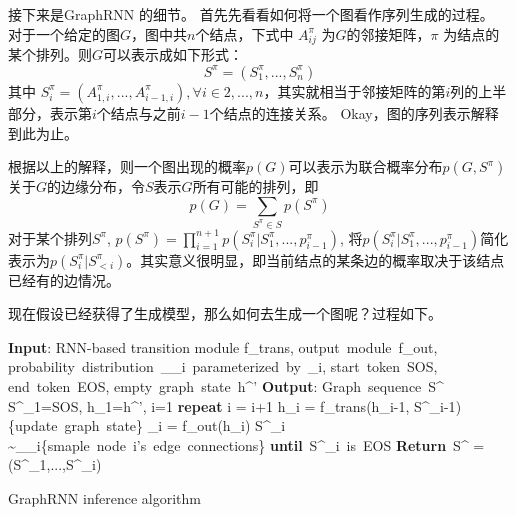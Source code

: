 \par 接下来是GraphRNN 的细节。
首先先看看如何将一个图看作序列生成的过程。
对于一个给定的图$G$，图中共$n$个结点，下式中 $A^{\pi}_{ij}$ 为$G$的邻接矩阵，$\pi$ 为结点的某个排列。则$G$可以表示成如下形式： 
$$
S^\pi = (S^{\pi}_1,...,S^{\pi}_n)
$$
其中 $S^{\pi}_i = (A^{\pi}_{1,i},..., A^{\pi}_{i-1,i}), \forall i \in {2,...,n} $，其实就相当于邻接矩阵的第$i$列的上半部分，表示第$i$个结点与之前$i-1$个结点的连接关系。
Okay，图的序列表示解释到此为止。

\par 根据以上的解释，则一个图出现的概率$p(G)$可以表示为联合概率分布$p(G, S^{\pi})$ 关于$G$的边缘分布，令$S$表示$G$所有可能的排列，即
$$
p(G) = \sum_{S^{\pi} \in S } p(S^{\pi}) 
$$
对于某个排列$S^{\pi}$, $p(S^{\pi}) = \prod_{i=1}^{n+1} p(S^{\pi}_i | S^{\pi}_1,...,p^{\pi}_{i-1})$, 将$p(S^{\pi}_i | S^{\pi}_1,...,p^{\pi}_{i-1})$简化表示为$p(S^{\pi}_i | S^{\pi}_{<i})$。其实意义很明显，即当前结点的某条边的概率取决于该结点已经有的边情况。

\par 现在假设已经获得了生成模型，那么如何去生成一个图呢？过程如下。
\begin{algorithm}[H]
    \begin{algorithmic}[1]
        \textbf{Input}: RNN-based transition module f_{trans}, output\ module\ f_{out}, \newline
        probability\ distribution\ _{\theta_{i}}\ parameterized\ by\ \theta_{i}, start\ token\ SOS, end\ token\  EOS, empty\ graph\ state\ h^{'} \newline
        \textbf{Output}: Graph\ sequence\ S^{\pi}
        S^{\pi}_1=SOS, h_1=h^{'}, i=1 \newline
        \textbf{repeat} \newline
            i = i+1 \newline
            h_i = f_{trans}(h_{i-1}, S^{\pi}_{i-1})\{update\ graph\ state\}\newline
            \theta_i = f_{out}(h_i) \newline
            S^{\pi}_{i} \sim {}_{\theta_i}\{smaple\ node\ i's\ edge\ connections\} \newline
        \textbf{until}\ S^{\pi}_i\ is\ EOS \newline
        \textbf{Return}\ S^{\pi} = (S^{\pi}_1,...,S^{\pi}_i) \newline
    \end{algorithmic}
    \caption{GraphRNN inference algorithm }
\end{algorithm}

